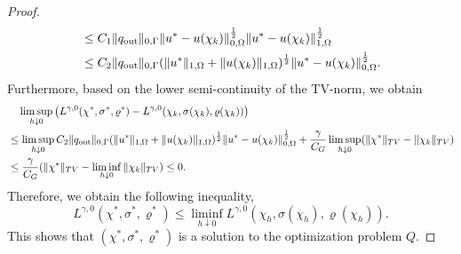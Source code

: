 \documentclass{amsart}
\begin{document}
\begin{proof}
\begin{align*}
        &\leq C_1\|q_{\rm out}\|_{0,\Gamma}\|u^*-u(\chi_k)\|_{0,\Omega}^{\frac{1}{2}}\|u^*-u(\chi_k)\|_{1,\Omega}^\frac{1}{2}\\
        &\leq C_2\|q_{\rm out}\|_{0,\Gamma}(\|u^*\|_{1,\Omega}+\|u(\chi_k)\|_{1,\Omega})^{\frac{1}{2}}\|u^*-u(\chi_k)\|_{0,\Omega}^{\frac{1}{2}}.
    \end{align*}
    Furthermore, based on the lower semi-continuity of the TV-norm, we obtain
    \begin{align*}
        &\quad\limsup_{h\downarrow 0}\left(L^{\gamma,0}(\chi^*,\sigma^*,\varrho^*)-L^{\gamma,0}(\chi_k,\sigma(\chi_k),\varrho(\chi_k))\right)\\
        &\leq \limsup_{h\downarrow 0}C_2\|q_{\rm out}\|_{0,\Gamma}(\|u^*\|_{1,\Omega}+\|u(\chi_k)\|_{1,\Omega})^{\frac{1}{2}}\|u^*-u(\chi_k)\|_{0,\Omega}^{\frac{1}{2}}+\dfrac{\gamma}{C_G}\limsup_{h\downarrow 0}(\|\chi^*\|_{TV}-\|\chi_k\|_{TV})\\
        &\leq\dfrac{\gamma}{C_G}(\|\chi^*\|_{TV}-\liminf_{h\downarrow 0}\|\chi_k\|_{TV})\leq 0.
    \end{align*}
    Therefore, we obtain the following inequality,
    \begin{equation}
        L^{\gamma,0}(\chi^*,\sigma^*,\varrho^*)\leq \liminf_{h\downarrow 0}L^{\gamma,0}(\chi_h,\sigma(\chi_h),\varrho(\chi_h)).
    \end{equation}
    This shows that \((\chi^*, \sigma^*, \varrho^*)\) is a solution to the optimization problem \( Q \).
\end{proof}
\end{document}
